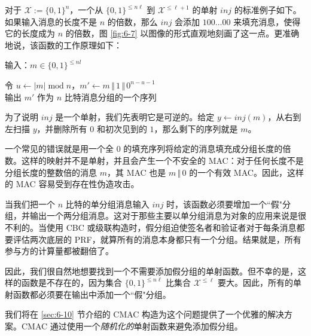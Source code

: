 \begin{snote}[一个单射函数。]
对于 $\mathcal{X}:=\{0,1\}^n$，一个从 $\{0,1\}^{\leq n\ell}$ 到 $\mathcal{X}^{\leq\ell+1}$ 的单射 $inj$ 的标准例子如下。如果输入消息的长度不是 $n$ 的倍数，那么 $inj$ 会添加 $100\dots00$ 来填充消息，使得它的长度成为 $n$ 的倍数，图 \ref{fig:6-7} 以图像的形式直观地刻画了这一点。更准确地说，该函数的工作原理如下：

\vspace{5pt}

\hspace*{5pt} 输入：$m\in\{0,1\}^{\leq nl}$

\vspace{3pt}

\hspace*{5pt} 令 $u\leftarrow|m|\;\mathrm{mod}\;n$，$m'\leftarrow m\,\Vert\,1\,\Vert\,0^{n-u-1}$\\
\hspace*{26pt} 输出 $m'$ 作为 $n$ 比特消息分组的一个序列

\vspace{5pt}

\noindent
为了说明 $inj$ 是一个单射，我们先表明它是可逆的。给定 $y\leftarrow inj(m)$，从右到左扫描 $y$，并删除所有 $0$ 和初次见到的 $1$，那么剩下的序列就是 $m$。

\vspace{5pt}

一个常见的错误就是用一个全 $0$ 的填充序列将给定的消息填充成分组长度的倍数。这样的映射并不是单射，并且会产生一个不安全的 MAC：对于任何长度不是分组长度的整数倍的消息 $m$，其 MAC 也是 $m\,\Vert\,0$ 的一个有效 MAC。因此，这样的 MAC 容易受到存在性伪造攻击。
\end{snote}

\begin{snote}[单射函数必会扩充。]
当我们把一个 $n$ 比特的单分组消息输入 $inj$ 时，该函数必须要增加一个``假"分组，并输出一个两分组消息。这对于那些主要以单分组消息为对象的应用来说是很不利的。当使用 CBC 或级联构造时，假分组迫使签名者和验证者对于每条消息都要评估两次底层的 PRF，就算所有的消息本身都只有一个分组。结果就是，所有参与方的计算量都被翻倍了。

因此，我们很自然地想要找到一个不需要添加假分组的单射函数。但不幸的是，这样的函数是不存在的，因为集合 $\{0,1\}^{\leq n\ell}$ 比集合 $\mathcal{X}^{\leq\ell}$ 要大。因此，所有的单射函数都必须要在输出中添加一个``假"分组。

我们将在 \ref{sec:6-10} 节介绍的 CMAC 构造为这个问题提供了一个优雅的解决方案。CMAC 通过使用一个\emph{随机化的}单射函数来避免添加假分组。
\end{snote}
